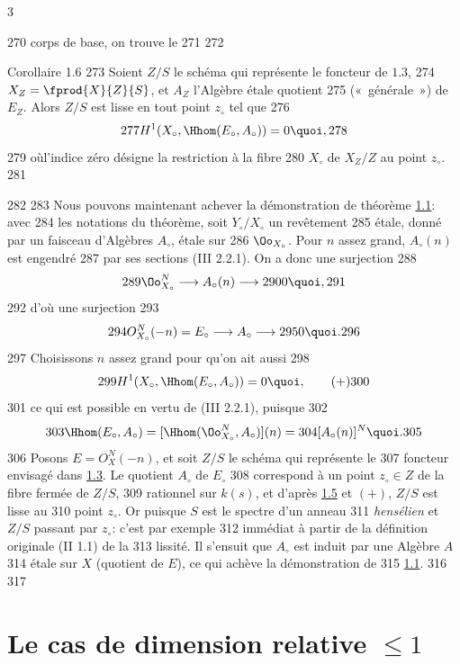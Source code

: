 3	\documentclass[10pt]{../fichiers-configuration-latex/smfart}
\begin{document}
   270	corps de base, on trouve le
   271	
   272	\begin{enonce*}{Corollaire 1.6}
   273	Soient $Z/S$ le schéma qui représente le foncteur de $1.3$,
   274	$X_Z=\fprod{X}{Z}{S}$, et $A_Z$ l'Algèbre étale quotient
   275	(« générale ») de $E_Z$. Alors $Z/S$ est lisse en tout point $z_{\circ}$ tel que
   276	$$
   277	H^1(X_{\circ},\Hhom(E_{\circ},A_{\circ}))=0{\quoi},
   278	$$
   279	où\pageoriginale l'indice zéro désigne la restriction à la fibre
   280	$X_{\circ}$ de $X_Z/Z$ au point $z_{\circ}$.
   281	\end{enonce*}
   282	
   283	Nous pouvons maintenant achever la démonstration de théorème \hyperref[XIII.prop1.1]{1.1}: avec
   284	les notations du théorème, soit $Y_{\circ}/X_{\circ}$ un revêtement
   285	étale, donné par un faisceau d'Algèbres $A_{\circ}$, étale sur
   286	$\Oo_{X_{\circ}}$. Pour $n$ assez grand, $A_{\circ}(n)$ est engendré
   287	par ses sections (\EGA III 2.2.1). On a donc une surjection
   288	$$
   289	\Oo^N_{X_{\circ}}\longrightarrow A_{\circ}(n)\longrightarrow
   290	0{\quoi},
   291	$$
   292	d'où une surjection
   293	$$
   294	O^N_{X_{\circ}}(-n)=E_{\circ}\longrightarrow A_{\circ}\longrightarrow
   295	0{\quoi}.
   296	$$
   297	Choisissons $n$ assez grand pour qu'on ait aussi
   298	\begin{equation*}
   299	H^1(X_{\circ},\Hhom(E_{\circ}, A_{\circ}))=0{\quoi},\tag{$+$}
   300	\end{equation*}
   301	ce qui est possible en vertu de (\EGA III 2.2.1), puisque
   302	$$
   303	\Hhom(E_{\circ},A_{\circ})=[\Hhom(\Oo^N_{X_{\circ}},A_{\circ})](n)=
   304	[A_{\circ}(n)]^N{\quoi}.
   305	$$
   306	Posons $E=O^N_X(-n)$, et soit $Z/S$ le schéma qui représente le
   307	foncteur envisagé dans \hyperref[XIII.lem1.3]{1.3}. Le quotient $A_{\circ}$ de $E_{\circ}$
   308	correspond à un point $z_{\circ}\in Z$ de la fibre fermée de $Z/S$,
   309	rationnel sur $k(s)$, et d'après \hyperref[XIII.subsec1.5]{1.5} et $(+)$, $Z/S$ est lisse au
   310	point $z_{\circ}$. Or puisque $S$ est le spectre d'un anneau
   311	\emph{hensélien} et $Z/S$ passant par $z_{\circ}$: c'est par exemple
   312	immédiat à partir de la définition originale (\SGA II 1.1) de la
   313	lissité. Il s'ensuit que $A_{\circ}$ est induit par une Algèbre $A$
   314	étale sur $X$ (quotient de $E$), ce qui achève la démonstration de
   315	\hyperref[XIII.prop1.1]{1.1}.
   316	
   317	\section{Le cas de dimension relative $≤ 1$}\pageoriginale 
\end{document}
